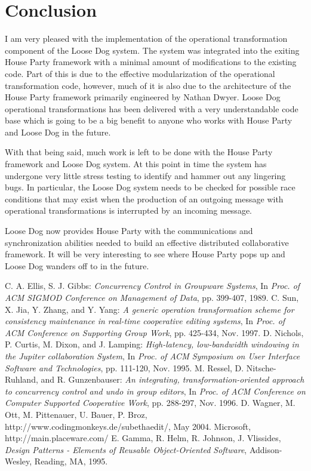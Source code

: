 \documentclass{article}
\begin{document}
\section{Conclusion}

I am very pleased with the implementation of the operational
transformation component of the Loose Dog system.  The system was
integrated into the exiting House Party framework with a minimal
amount of modifications to the existing code.  Part of this is due to
the effective modularization of the operational transformation code,
however, much of it is also due to the architecture of the House Party
framework primarily engineered by Nathan Dwyer.  Loose Dog operational
transformations has been delivered with a very understandable code
base which is going to be a big benefit to anyone
who works with House Party and Loose Dog in the future.

With that being said, much work is left to be done with the House
Party framework and Loose Dog system.  At this point in time the
system has undergone very little stress testing to identify and hammer
out any lingering bugs.  In particular, the Loose Dog system needs to
be checked for possible race conditions that may exist when the
production of an outgoing message with operational transformations is
interrupted by an incoming message.

Loose Dog now provides House Party with the communications and
synchronization abilities needed to build an effective distributed
collaborative framework.  It will be very interesting to see where
House Party pops up and Loose Dog wanders off to in the future.

\newpage

\begin{thebibliography}{99}
 C. A. Ellis, S. J. Gibbs: \emph{Concurrency Control in
  Groupware Systems}, In \emph{Proc. of ACM SIGMOD Conference on Management
  of Data}, pp. 399-407, 1989.
 C. Sun, X. Jia, Y. Zhang, and Y. Yang: \emph{A
  generic operation transformation scheme for consistency maintenance
  in real-time cooperative editing systems}, In \emph{Proc. of ACM
  Conference on Supporting Group Work}, pp. 425-434, Nov. 1997.
 D. Nichols, P. Curtis, M. Dixon, and J. Lamping:
  \emph{High-latency, low-bandwidth windowing in the Jupiter
  collaboration System}, In \emph{Proc. of ACM Symposium on User Interface
  Software and Technologies}, pp. 111-120, Nov. 1995.
 M. Ressel, D. Nitsche-Ruhland, and R. Gunzenbauser:
  \emph{An integrating, transformation-oriented approach to
  concurrency control and undo in group editors}, In \emph{Proc. of
  ACM Conference on Computer Supported Cooperative Work}, pp. 288-297,
  Nov. 1996.
 D. Wagner, M. Ott, M. Pittenauer, U. Bauer, P. Broz,
http://www.codingmonkeys.de/subethaedit/, May 2004.
 Microsoft, http://main.placeware.com/
 E. Gamma, R. Helm, R. Johnson, J. Vlissides,
  \emph{Design Patterns - Elements of Reusable Object-Oriented
  Software}, Addison-Wesley, Reading, MA, 1995.

\end{thebibliography}
\end{document}
